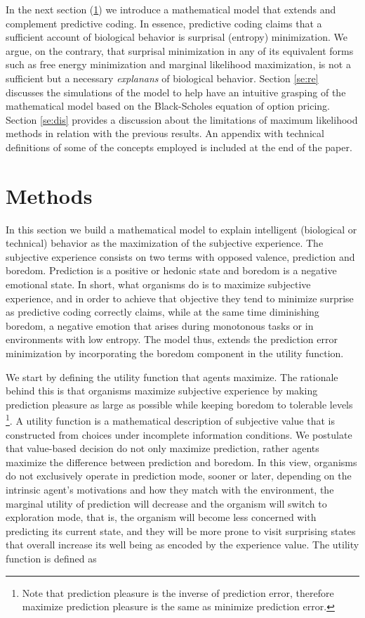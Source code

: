 \documentclass[11pt,twocolumn]{article}
\begin{document}
In the next section (\ref{se:methods}) we introduce a mathematical model that extends and complement predictive coding. In essence, predictive coding claims that a sufficient account of biological behavior is surprisal (entropy) minimization. We argue, on the contrary, that surprisal minimization in any of its equivalent forms such as free energy minimization and marginal likelihood maximization, is not a sufficient but a necessary \emph{explanans} of biological behavior. Section \ref{se:re} discusses the simulations of the model to help have an intuitive grasping of the mathematical model based on the Black-Scholes equation of option pricing. Section \ref{se:dis} provides a discussion about the limitations of maximum likelihood methods in relation with the previous results. An appendix with technical definitions of some of the concepts employed is included at the end of the paper.

\section{Methods}
\label{se:methods}

In this section we build a mathematical model to explain intelligent (biological or technical) behavior as the maximization of the subjective experience. 
The subjective experience consists on two terms with opposed valence, prediction and boredom. Prediction is a positive or hedonic state and boredom is a negative emotional state. In short, what organisms do is to maximize subjective experience, and in order to achieve that objective  they tend to minimize surprise as predictive coding correctly claims, while at the same time diminishing boredom, a negative emotion that arises during monotonous tasks or in environments with low entropy. The model thus, extends the prediction error minimization by incorporating the boredom component in the utility function. 

We start by defining the utility function that agents maximize. The rationale behind this is that organisms maximize subjective experience by making prediction pleasure as large as possible while keeping boredom to tolerable levels  \footnote{Note that prediction pleasure is the inverse of prediction error, therefore maximize prediction pleasure is the same as minimize prediction error.}.
A utility function is a mathematical description of subjective value that is constructed from choices under incomplete information conditions. We postulate that value-based decision do not only maximize prediction, rather agents maximize the difference between prediction and boredom. In this view, organisms do not exclusively operate in prediction mode, sooner or later, depending on the intrinsic agent's motivations and how they match with the environment, the marginal utility of prediction will decrease and the organism will switch to exploration mode, that is, the organism will become less concerned with predicting its current state, and they will be more prone to visit surprising states that overall increase its well being as encoded by the experience value. 
The utility function is defined as
\end{document}
